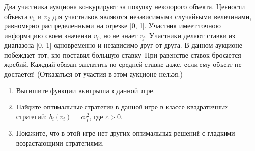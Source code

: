 \begin{comment}
Используя это и кососимметричность матрицы $A$, покажите
\[
M\left[ {\Phi \left( {t+1} \right)} \right]\le M\left[ {\Phi \left( t 
\right)} \right]\left( {1+{\varepsilon ^2} \mathord{\left/ {\vphantom 
{{\varepsilon ^2} 6}} \right. \kern-\nulldelimiterspace} 6} \right).
\]
Следовательно, $M\left[ {\Phi \left( t \right)} \right]\le n\exp \left( 
{{t\varepsilon ^2} \mathord{\left/ {\vphantom {{t\varepsilon ^2} 6}} \right. 
\kern-\nulldelimiterspace} 6} \right)$ и $M\left[ {\Phi \left( {t^\ast } 
\right)} \right]\le n^{5 \mathord{\left/ {\vphantom {5 3}} \right. 
\kern-\nulldelimiterspace} 3}$. Отсюда по неравенству Маркова имеем, что 
($n\ge 8)$
\[
P\left( {\Phi \left( {t^\ast } \right)\le n^2} \right)\ge P\left( {\Phi 
\left( {t^\ast } \right)\le 2n^{5 \mathord{\left/ {\vphantom {5 3}} \right. 
\kern-\nulldelimiterspace} 3}} \right)\ge 1 \mathord{\left/ {\vphantom {1 
2}} \right. \kern-\nulldelimiterspace} 2.
\]
Тогда $P\left( {{\varepsilon U_i \left( {t^\ast } \right)} \mathord{\left/ 
{\vphantom {{\varepsilon U_i \left( {t^\ast } \right)} 2}} \right. 
\kern-\nulldelimiterspace} 2\le 2\ln n,\;i=1,...,n} \right)\ge 1 
\mathord{\left/ {\vphantom {1 2}} \right. \kern-\nulldelimiterspace} 2$. 
Откуда уже следует, что $P\left( {\vec {x}\left( {t^\ast } \right)\le 
\varepsilon \vec {e}} \right)\ge 1 \mathord{\left/ {\vphantom {1 2}} \right. 
\kern-\nulldelimiterspace} 2$.
\end{problem}
 \end{comment}

\begin{problem}
Два участника аукциона конкурируют за покупку некоторого объекта. Ценности объекта    $v_1$ и $v_2$ для участников являются независимыми случайными величинами, равномерно распределенными на отрезке [0, 1]. Участник  имеет точною информацию своем значении $v_i$, но не знает $v_j$. Участники делают ставки из диапазона [0, 1] одновременно и независимо друг от друга. В данном аукционе побеждает тот, кто поставил большую ставку. При равенстве ставок бросается жребий. Каждый обязан заплатить по средней ставке даже, если ему объект не достается! (Отказаться от участия в этом аукционе нельзя.)
\begin{enumerate}
\item Выпишите функции выигрыша в данной игре.
\item Найдите оптимальные стратегии в данной игре в классе квадратичных стратегий: $b_i(v_i) = cv_i^2$, где $c > 0$.
\item Покажите, что в этой игре нет других оптимальных решений с гладкими возрастающими стратегиями.
\end{enumerate}
\end{problem}
